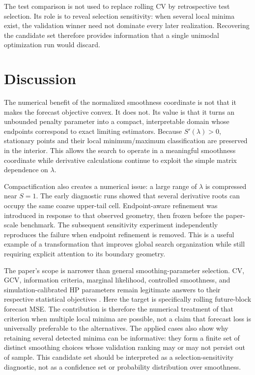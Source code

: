 \documentclass[english]{smcca}
\begin{document}
The test comparison is not used to replace rolling CV by retrospective test
selection. Its role is to reveal selection sensitivity: when several local
minima exist, the validation winner need not dominate every later realization.
Recovering the candidate set therefore provides information that a single
unimodal optimization run would discard.



\section{Discussion}

The numerical benefit of the normalized smoothness coordinate is not that it makes the forecast objective convex. It does not. Its value is that it turns an unbounded penalty parameter into a compact, interpretable domain whose endpoints correspond to exact limiting estimators. Because \(S'(\lambda)>0\), stationary points and their local minimum/maximum classification are preserved in the interior. This allows the search to operate in a meaningful smoothness coordinate while derivative calculations continue to exploit the simple matrix dependence on \(\lambda\).

Compactification also creates a numerical issue: a large range of \(\lambda\) is compressed near \(S=1\). The early diagnostic runs showed that several derivative roots can occupy the same coarse upper-tail cell. Endpoint-aware refinement was introduced in response to that observed geometry, then frozen before the paper-scale benchmark. The subsequent sensitivity experiment independently reproduces the failure when endpoint refinement is removed. This is a useful example of a transformation that improves global search organization while still requiring explicit attention to its boundary geometry.

The paper's scope is narrower than general smoothing-parameter selection. CV, GCV, information criteria, marginal likelihood, controlled smoothness, and simulation-calibrated HP parameters remain legitimate answers to their respective statistical objectives \cite{craven1979gcv,guerrero2008smoothness,cortes2017smoothness,biessy2026wh,franke2026hp}. Here the target is specifically rolling future-block forecast MSE. The contribution is therefore the numerical treatment of that criterion when multiple local minima are possible, not a claim that forecast loss is universally preferable to the alternatives. The applied cases also show why retaining several detected minima can be informative: they form a finite set of distinct smoothing choices whose validation ranking may or may not persist out of sample. This candidate set should be interpreted as a selection-sensitivity diagnostic, not as a confidence set or probability distribution over smoothness.
\end{document}
